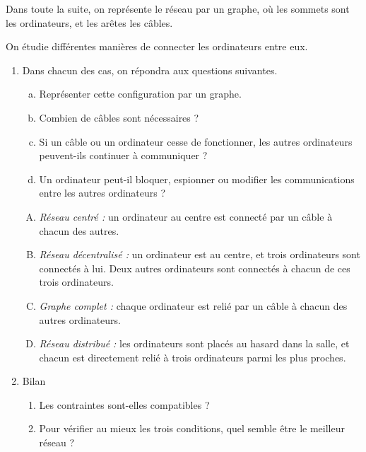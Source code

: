 Dans toute la suite, on représente le réseau par un graphe, où les sommets sont les ordinateurs, et les arêtes les câbles.

On étudie différentes manières de connecter les ordinateurs entre eux.

\begin{enumerate}
  \item Dans chacun des cas, on répondra aux questions suivantes.
\begin{enumerate}[(a)]
  \item Représenter cette configuration par un graphe.
  \item Combien de câbles sont nécessaires ?
  \item Si un câble ou un ordinateur cesse de fonctionner, les autres ordinateurs peuvent-ils continuer à communiquer ?
  \item Un ordinateur peut-il bloquer, espionner ou modifier les communications entre les autres ordinateurs ?
\end{enumerate}

\begin{enumerate}[(A)]
  \item \emph{Réseau centré :} un ordinateur au centre est connecté par un câble à chacun des autres.
  \item \emph{Réseau décentralisé :} un ordinateur est au centre, et trois ordinateurs sont connectés à lui. Deux autres ordinateurs sont connectés à chacun de ces trois ordinateurs.
  \item \emph{Graphe complet :} chaque ordinateur est relié par un câble à chacun des autres ordinateurs.
  \item \emph{Réseau distribué :} les ordinateurs sont placés au hasard dans la salle, et chacun est directement relié à trois ordinateurs parmi les plus proches.
\end{enumerate}
\item Bilan
  \begin{enumerate}
    \item Les contraintes sont-elles compatibles ?
    \item Pour vérifier au mieux les trois conditions, quel semble être le meilleur réseau ?
  \end{enumerate}
\end{enumerate}


